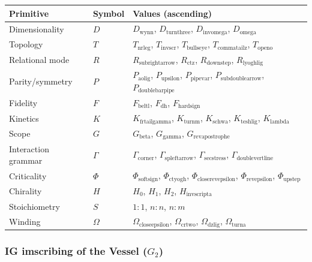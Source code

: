 \documentclass[12pt,a4paper]{article}
\begin{document}
\begin{table}[htbp]
\centering
\small
{}
\begin{tabularx}{\textwidth}{>{\centering\arraybackslash}X >{\centering\arraybackslash}X >{\centering\arraybackslash}X}
\toprule
\rowcolor{gray!25}\textbf{Primitive} & \textbf{Symbol} & \textbf{Values (ascending)} \\
\midrule
\rowcolors{1}{white}{gray!10}
Dimensionality & $D$ & $D_{\text{wynn}}$, $D_{\text{turnthree}}$, $D_{\text{invomega}}$, $D_{\text{omega}}$ \\
Topology & $T$ & $T_{\text{nrleg}}$, $T_{\text{invscr}}$, $T_{\text{bullseye}}$, $T_{\text{commatailz}}$, $T_{\text{openo}}$ \\
Relational mode & $R$ & $R_{\text{subrightarrow}}$, $R_{\text{ctz}}$, $R_{\text{downstep}}$, $R_{\text{lyoghlig}}$ \\
Parity/symmetry & $P$ & $P_{\text{aolig}}$, $P_{\text{upsilon}}$, $P_{\text{pipevar}}$, $P_{\text{subdoublearrow}}$, $P_{\text{doublebarpipe}}$ \\
Fidelity & $F$ & $F_{\text{beltl}}$, $F_{\text{dh}}$, $F_{\text{hardsign}}$ \\
Kinetics & $K$ & $K_{\text{frtailgamma}}$, $K_{\text{turnm}}$, $K_{\text{schwa}}$, $K_{\text{teshlig}}$, $K_{\text{lambda}}$ \\
Scope & $G$ & $G_{\text{beta}}$, $G_{\text{gamma}}$, $G_{\text{revapostrophe}}$ \\
Interaction grammar & $\Gamma$ & $\Gamma_{\text{corner}}$, $\Gamma_{\text{spleftarrow}}$, $\Gamma_{\text{secstress}}$, $\Gamma_{\text{doublevertline}}$ \\
Criticality & $\Phi$ & $\Phi_{\text{softsign}}$, $\Phi_{\text{ctyogh}}$, $\Phi_{\text{closerevepsilon}}$, $\Phi_{\text{revepsilon}}$, $\Phi_{\text{upstep}}$ \\
Chirality & $H$ & $H_0$, $H_1$, $H_2$, $H_{\text{invscripta}}$ \\
Stoichiometry & $S$ & $1{:}1$, $n{:}n$, $n{:}m$ \\
Winding & $\Omega$ & $\Omega_{\text{closeepsilon}}$, $\Omega_{\text{crtwo}}$, $\Omega_{\text{dzlig}}$, $\Omega_{\text{turna}}$ \\
\bottomrule
\end{tabularx}
\end{table}

\subsubsection{IG imscribing of the Vessel ($G_2$)}
\end{document}
